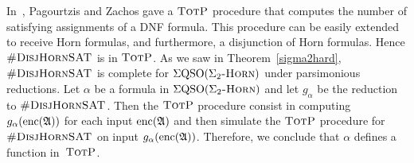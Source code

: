 In~\cite{PagourtzisZ06}, Pagourtzis and Zachos gave a $\text{\sc TotP}$ procedure that computes the number of satisfying assignments of a DNF formula. This procedure can be easily extended to receive Horn formulas, and furthermore, a disjunction of Horn formulas. Hence $\textsc{\#DisjHornSAT}$ is in $\text{\sc TotP}$. As we saw in Theorem~\ref{sigma2hard}, $\textsc{\#DisjHornSAT}$ is complete for $\Sigma{\rm QSO}(\Sigma_2\textsc{-Horn})$ under parsimonious reductions. Let $\alpha$ be a formula in $\Sigma{\rm QSO}(\Sigma_2\textsc{-Horn})$ and let $g_{\alpha}$ be the reduction to $\textsc{\#DisjHornSAT}$. Then the $\text{\sc TotP}$ procedure consist in computing $g_{\alpha}({\rm enc}(\mathfrak{A}))$ for each input ${\rm enc}(\mathfrak{A})$ and then simulate the $\text{\sc TotP}$ procedure for $\textsc{\#DisjHornSAT}$ on input $g_{\alpha}({\rm enc}(\mathfrak{A}))$. Therefore, we conclude that $\alpha$ defines a function in~$\text{\sc TotP}$.